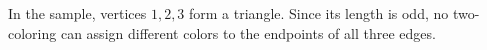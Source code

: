 In the sample, vertices $1,2,3$ form a triangle. Since its length is odd, no two-coloring can assign different colors to the endpoints of all three edges.

